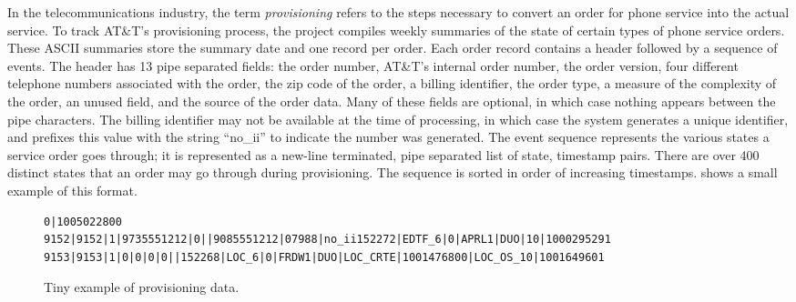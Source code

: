 In the telecommunications industry, the term \textit{provisioning}
refers to the steps necessary to convert an order for phone service
into the actual service.  To track AT\&T's provisioning process, the
\dibbler{} project compiles weekly summaries of the state of certain
types of phone service orders.  These ASCII summaries store the
summary date and one record per order.  Each order record contains a
header followed by a sequence of events.  The header has 13 pipe
separated fields: the order number, AT\&T's internal order number, the
order version, four different telephone numbers associated with the
order, the zip code of the order, a billing identifier, the order
type, a measure of the complexity of the order, an unused field, and
the source of the order data.  Many of these fields are optional, in
which case nothing appears between the pipe characters.  The billing
identifier may not be available at the time of processing, in which
case the system generates a unique identifier, and prefixes this value
with the string ``no\_ii'' to indicate the number was generated. The
event sequence represents the various states a service order goes
through; it is represented as a new-line terminated, pipe separated
list of state, timestamp pairs.  There are over 400 distinct states
that an order may go through during provisioning.  The sequence is
sorted in order of increasing
timestamps.  shows a small example of
this format.


\begin{figure*}[t!]
\end{figure*}

\begin{figure*}
\begin{footnotesize}
\begin{center}
\begin{verbatim}
0|1005022800
9152|9152|1|9735551212|0||9085551212|07988|no_ii152272|EDTF_6|0|APRL1|DUO|10|1000295291
9153|9153|1|0|0|0|0||152268|LOC_6|0|FRDW1|DUO|LOC_CRTE|1001476800|LOC_OS_10|1001649601
\end{verbatim}
\caption{Tiny example of \dibbler{} provisioning data.}
\label{figure:dibbler-records}
\end{center}
\end{footnotesize}
\end{figure*}

